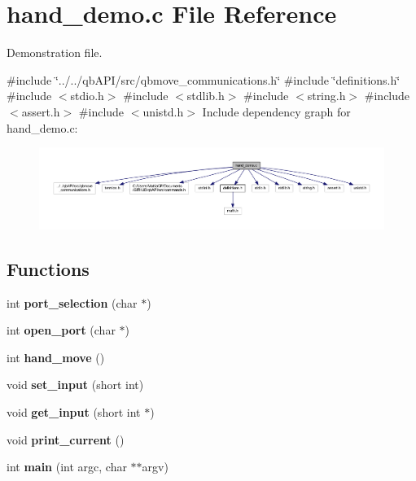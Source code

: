 \section{hand\+\_\+demo.\+c File Reference}
\label{hand__demo_8c}


Demonstration file.  


{\ttfamily \#include \char`\"{}../../qb\+A\+P\+I/src/qbmove\+\_\+communications.\+h\char`\"{}}\newline
{\ttfamily \#include \char`\"{}definitions.\+h\char`\"{}}\newline
{\ttfamily \#include $<$stdio.\+h$>$}\newline
{\ttfamily \#include $<$stdlib.\+h$>$}\newline
{\ttfamily \#include $<$string.\+h$>$}\newline
{\ttfamily \#include $<$assert.\+h$>$}\newline
{\ttfamily \#include $<$unistd.\+h$>$}\newline
Include dependency graph for hand\+\_\+demo.\+c\+:\nopagebreak
\begin{figure}[H]
\begin{center}
\leavevmode
\includegraphics[width=350pt]{hand__demo_8c__incl}
\end{center}
\end{figure}
\subsection*{Functions}
\begin{DoxyCompactItemize}
\item 
\mbox{\label{hand__demo_8c_a4347eeebb915c2bd627acfbe8cda5bb9}} 
int {\bfseries port\+\_\+selection} (char $\ast$)
\item 
\mbox{\label{hand__demo_8c_a61a603d6ab622032ccf84775af74e960}} 
int {\bfseries open\+\_\+port} (char $\ast$)
\item 
\mbox{\label{hand__demo_8c_a432357bee330d9aac22de4131c290736}} 
int {\bfseries hand\+\_\+move} ()
\item 
\mbox{\label{hand__demo_8c_a005a3a684f8bd16cf4995c987f203c79}} 
void {\bfseries set\+\_\+input} (short int)
\item 
\mbox{\label{hand__demo_8c_a23b249b7c8456732056e88aa66bc2d30}} 
void {\bfseries get\+\_\+input} (short int $\ast$)
\item 
\mbox{\label{hand__demo_8c_a08bb75e02d6a2ded2201f0ad8f4af35e}} 
void {\bfseries print\+\_\+current} ()
\item 
\mbox{\label{hand__demo_8c_a3c04138a5bfe5d72780bb7e82a18e627}} 
int {\bfseries main} (int argc, char $\ast$$\ast$argv)
\end{DoxyCompactItemize}
